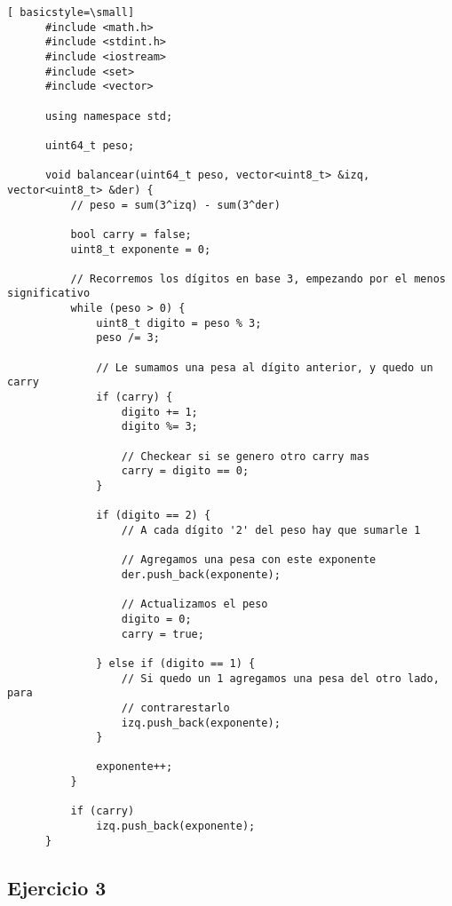 \begin{lstlisting}[ basicstyle=\small]
      #include <math.h>
      #include <stdint.h>
      #include <iostream>
      #include <set>
      #include <vector>

      using namespace std;

      uint64_t peso;

      void balancear(uint64_t peso, vector<uint8_t> &izq, vector<uint8_t> &der) {
          // peso = sum(3^izq) - sum(3^der)

          bool carry = false;
          uint8_t exponente = 0;

          // Recorremos los dígitos en base 3, empezando por el menos significativo
          while (peso > 0) {
              uint8_t digito = peso % 3;
              peso /= 3;

              // Le sumamos una pesa al dígito anterior, y quedo un carry
              if (carry) {
                  digito += 1;
                  digito %= 3;

                  // Checkear si se genero otro carry mas
                  carry = digito == 0;
              }

              if (digito == 2) {
                  // A cada dígito '2' del peso hay que sumarle 1

                  // Agregamos una pesa con este exponente
                  der.push_back(exponente);

                  // Actualizamos el peso
                  digito = 0;
                  carry = true;

              } else if (digito == 1) {
                  // Si quedo un 1 agregamos una pesa del otro lado, para
                  // contrarestarlo
                  izq.push_back(exponente);
              }

              exponente++;
          }

          if (carry)
              izq.push_back(exponente);
      }
\end{lstlisting}

\newpage
\subsection{Ejercicio 3}

